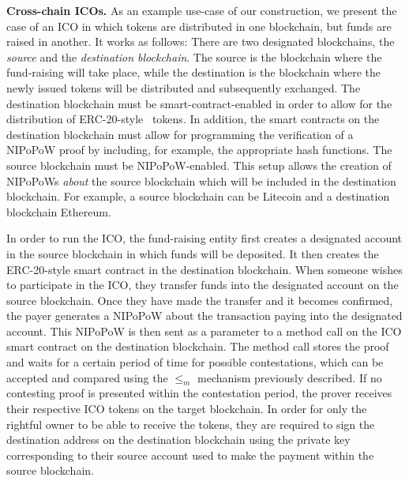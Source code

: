 \noindent
\textbf{Cross-chain ICOs.}
As an example use-case of our construction, we present the case of an
ICO in which tokens are distributed in one blockchain,
but funds are raised in another. It works as follows:
There are two designated blockchains, the \textit{source} and
the \textit{destination blockchain}. The source is the blockchain
where the fund-raising will take place, while the destination is the
blockchain where the newly issued tokens will be distributed and subsequently
exchanged. The destination blockchain must be smart-contract-enabled in order to
allow for the distribution of ERC-20-style~\cite{erc20} tokens.
In addition, the smart contracts on the destination blockchain must allow for
programming the verification of a NIPoPoW proof by including, for example, the
appropriate hash functions. The source blockchain must be NIPoPoW-enabled. This
setup allows the creation of NIPoPoWs \textit{about} the source blockchain which
will be included in the destination blockchain. For example, a source blockchain
can be Litecoin and a destination blockchain Ethereum.

In order to run the ICO, the fund-raising entity first creates a designated
account in the source blockchain in which funds will be deposited. It then
creates the ERC-20-style smart contract in the destination blockchain. When
someone wishes to participate in the ICO, they transfer funds into the
designated account on the source blockchain. Once they have made the transfer
and it becomes confirmed, the payer generates a NIPoPoW about the transaction
paying into the designated account. This NIPoPoW is then sent as a parameter to
a method call on the ICO smart contract on the destination blockchain. The
method call stores the proof and waits for a certain period of time for possible
contestations, which can be accepted and compared using the $\leq_m$ mechanism
previously described. If no contesting proof is presented within the
contestation period, the prover receives their respective ICO tokens on the
target blockchain. In order for only the rightful owner to be able to receive
the tokens, they are required to sign the destination address on the destination
blockchain using the private key corresponding to their source account used to
make the payment within the source blockchain.

